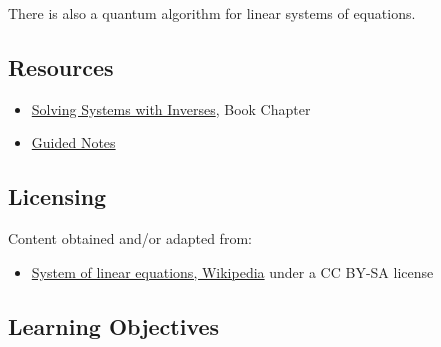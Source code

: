 There is also a quantum algorithm for linear systems of equations.




\subsection{Resources}
\label{sss:reso-55b5}




\begin{itemize}
    \item \href{https://mathresearch.utsa.edu/wikiFiles/MAT1053/Solving_Systems_with_Inverses/MAT1053_M10.2Solving_Systems_with_Inverses.pdf}{Solving Systems with Inverses}, Book Chapter
    \item \href{https://mathresearch.utsa.edu/wikiFiles/MAT1053/Solving_Systems_with_Inverses/MAT1053_M10.2Solving_Systems_with_InversesGN.pdf}{Guided Notes}
\end{itemize}


\subsection{Licensing}
\label{sss:lice-7352}




Content obtained and/or adapted from:



\begin{itemize}
    \item \href{https://en.wikipedia.org/wiki/System_of_linear_equations}{System of linear equations, Wikipedia} under a CC BY-SA license
\end{itemize}


\subsection{Learning Objectives}
\label{ssec:lear-fe6e}


